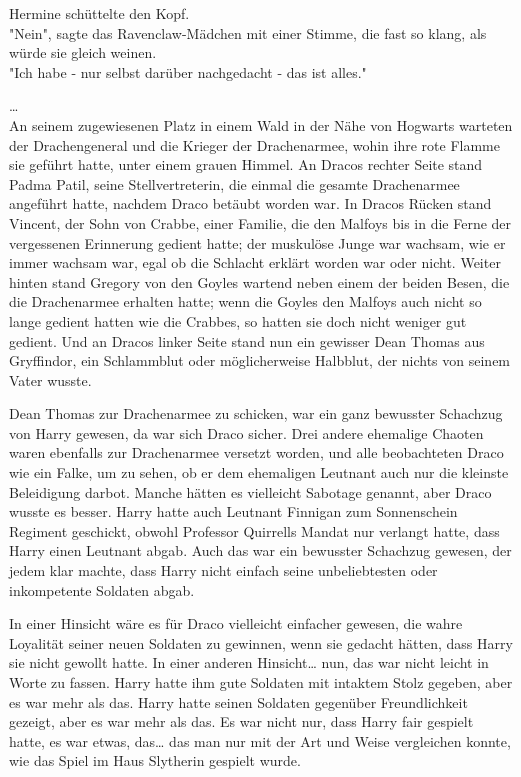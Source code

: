 {Hermine schüttelte den Kopf.\\ "Nein", sagte das Ravenclaw-Mädchen mit einer Stimme, die fast so klang, als würde sie gleich weinen.\\ "Ich habe - nur selbst darüber nachgedacht - das ist alles."

…\\ An seinem zugewiesenen Platz in einem Wald in der Nähe von Hogwarts warteten der Drachengeneral und die Krieger der Drachenarmee, wohin ihre rote Flamme sie geführt hatte, unter einem grauen Himmel. An Dracos rechter Seite stand Padma Patil, seine Stellvertreterin, die einmal die gesamte Drachenarmee angeführt hatte, nachdem Draco betäubt worden war. In Dracos Rücken stand Vincent, der Sohn von Crabbe, einer Familie, die den Malfoys bis in die Ferne der vergessenen Erinnerung gedient hatte; der muskulöse Junge war wachsam, wie er immer wachsam war, egal ob die Schlacht erklärt worden war oder nicht. Weiter hinten stand Gregory von den Goyles wartend neben einem der beiden Besen, die die Drachenarmee erhalten hatte; wenn die Goyles den Malfoys auch nicht so lange gedient hatten wie die Crabbes, so hatten sie doch nicht weniger gut gedient. Und an Dracos linker Seite stand nun ein gewisser Dean Thomas aus Gryffindor, ein Schlammblut oder möglicherweise Halbblut, der nichts von seinem Vater wusste.

Dean Thomas zur Drachenarmee zu schicken, war ein ganz bewusster Schachzug von Harry gewesen, da war sich Draco sicher. Drei andere ehemalige Chaoten waren ebenfalls zur Drachenarmee versetzt worden, und alle beobachteten Draco wie ein Falke, um zu sehen, ob er dem ehemaligen Leutnant auch nur die kleinste Beleidigung darbot. Manche hätten es vielleicht Sabotage genannt, aber Draco wusste es besser. Harry hatte auch Leutnant Finnigan zum Sonnenschein Regiment geschickt, obwohl Professor Quirrells Mandat nur verlangt hatte, dass Harry einen Leutnant abgab. Auch das war ein bewusster Schachzug gewesen, der jedem klar machte, dass Harry nicht einfach seine unbeliebtesten oder inkompetente Soldaten abgab.

In einer Hinsicht wäre es für Draco vielleicht einfacher gewesen, die wahre Loyalität seiner neuen Soldaten zu gewinnen, wenn sie gedacht hätten, dass Harry sie nicht gewollt hatte. In einer anderen Hinsicht… nun, das war nicht leicht in Worte zu fassen. Harry hatte ihm gute Soldaten mit intaktem Stolz gegeben, aber es war mehr als das. Harry hatte seinen Soldaten gegenüber Freundlichkeit gezeigt, aber es war mehr als das. Es war nicht nur, dass Harry fair gespielt hatte, es war etwas, das… das man nur mit der Art und Weise vergleichen konnte, wie das Spiel im Haus Slytherin gespielt wurde.

}
